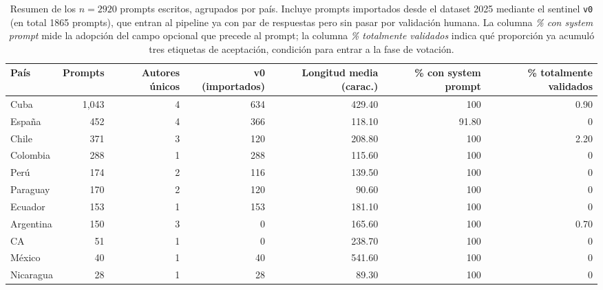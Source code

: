 \begin{table}[ht]
    \centering
    \caption{Resumen de los $n=2920$ prompts escritos, agrupados por país. Incluye prompts importados desde el dataset 2025 mediante el sentinel \texttt{v0} (en total 1865 prompts), que entran al pipeline ya con par de respuestas pero sin pasar por validación humana. La columna \textit{\% con system prompt} mide la adopción del campo opcional que precede al prompt; la columna \textit{\% totalmente validados} indica qué proporción ya acumuló tres etiquetas de aceptación, condición para entrar a la fase de votación.}
    \label{tab:prompts}
    \begin{tabular}{lrrrrrr}
    \toprule
    País & Prompts & Autores únicos & v0 (importados) & Longitud media (carac.) & \% con system prompt & \% totalmente validados \\
    \midrule
    Cuba & 1,043 & 4 & 634 & 429.40 & 100 & 0.90 \\
    España & 452 & 4 & 366 & 118.10 & 91.80 & 0 \\
    Chile & 371 & 3 & 120 & 208.80 & 100 & 2.20 \\
    Colombia & 288 & 1 & 288 & 115.60 & 100 & 0 \\
    Perú & 174 & 2 & 116 & 139.50 & 100 & 0 \\
    Paraguay & 170 & 2 & 120 & 90.60 & 100 & 0 \\
    Ecuador & 153 & 1 & 153 & 181.10 & 100 & 0 \\
    Argentina & 150 & 3 & 0 & 165.60 & 100 & 0.70 \\
    CA & 51 & 1 & 0 & 238.70 & 100 & 0 \\
    México & 40 & 1 & 40 & 541.60 & 100 & 0 \\
    Nicaragua & 28 & 1 & 28 & 89.30 & 100 & 0 \\
    \bottomrule
    \end{tabular}
\end{table}
